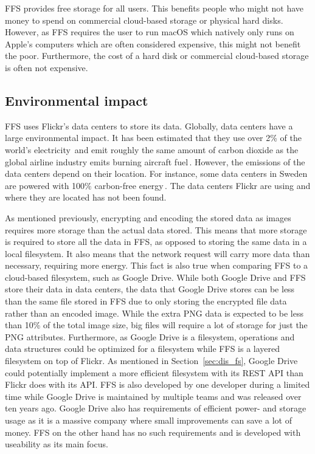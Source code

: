 \gls{FFS} provides free storage for all users. This benefits people who might not have money to spend on commercial \mbox{cloud-based} storage or physical hard disks. However, as \gls{FFS} requires the user to run macOS which natively only runs on Apple's computers which are often considered expensive, this might not benefit the poor. Furthermore, the cost of a hard disk or commercial \mbox{cloud-based} storage is often not expensive.

\subsection{Environmental impact}
\label{subsec:imp_env}
\gls{FFS} uses Flickr's data centers to store its data. Globally, data centers have a large environmental impact. It has been estimated that they use over 2\% of the world's electricity\,\cite{mcleanDataCentersGenerate2020} and emit roughly the same amount of carbon dioxide as the global airline industry emits burning aircraft fuel\,\cite{pearceEnergyHogsCan}. However, the emissions of the data centers depend on their location. For instance, some data centers in Sweden are powered with 100\% carbon-free energy\,\cite{cappellaSwedenSustainableData2022,unfcccEcoDataCenterSwedenUNFCCC}. The data centers Flickr are using and where they are located has not been found.

As mentioned previously, encrypting and encoding the stored data as images requires more storage than the actual data stored. This means that more storage is required to store all the data in \gls{FFS}, as opposed to storing the same data in a local filesystem. It also means that the network request will carry more data than necessary, requiring more energy. This fact is also true when comparing \gls{FFS} to a \mbox{cloud-based} filesystem, such as Google Drive. While both Google Drive and \gls{FFS} store their data in data centers, the data that Google Drive stores can be less than the same file stored in \gls{FFS} due to only storing the encrypted file data rather than an encoded image. While the extra PNG data is expected to be less than 10\% of the total image size, big files will require a lot of storage for just the PNG attributes. Furthermore, as Google Drive is a filesystem, operations and data structures could be optimized for a filesystem while \gls{FFS} is a layered filesystem on top of Flickr. As mentioned in Section~\ref{sec:dis_fs}, Google Drive could potentially implement a more efficient filesystem with its REST \gls{API} than Flickr does with its \gls{API}. \gls{FFS} is also developed by one developer during a limited time while Google Drive is maintained by multiple teams and was released over ten years ago. Google Drive also has requirements of efficient power- and storage usage as it is a massive company where small improvements can save a lot of money. \gls{FFS} on the other hand has no such requirements and is developed with useability as its main focus. 

